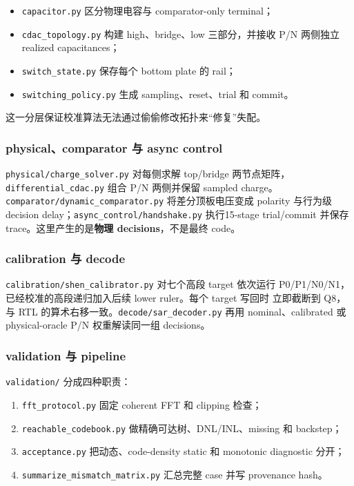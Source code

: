 \documentclass[UTF8,11pt,a4paper]{ctexart}
\newcommand{\code}[1]{\texttt{\small #1}}
\newcommand{\keyterm}[1]{\textbf{\color{DeepNavy}#1}}
\begin{document}
\begin{itemize}
  \item \code{capacitor.py} 区分物理电容与 comparator-only terminal；
  \item \code{cdac\_topology.py} 构建 high、bridge、low 三部分，并接收 P/N
    两侧独立 realized capacitances；
  \item \code{switch\_state.py} 保存每个 bottom plate 的 rail；
  \item \code{switching\_policy.py} 生成 sampling、reset、trial 和 commit。
\end{itemize}

这一分层保证校准算法无法通过偷偷修改拓扑来“修复”失配。

\subsubsection{physical、comparator 与 async control}

\code{physical/charge\_solver.py} 对每侧求解 top/bridge 两节点矩阵，
\code{differential\_cdac.py} 组合 P/N 两侧并保留 sampled charge。
\code{comparator/dynamic\_comparator.py} 将差分顶板电压变成 polarity 与行为级
decision delay；\code{async\_control/handshake.py} 执行15-stage
trial/commit 并保存 trace。这里产生的是\keyterm{物理 decisions}，不是最终 code。

\subsubsection{calibration 与 decode}

\code{calibration/shen\_calibrator.py} 对七个高段 target 依次运行
P0/P1/N0/N1，已经校准的高段递归加入后续 lower ruler。每个 target 写回时
立即截断到 Q8，与 RTL 的算术右移一致。\code{decode/sar\_decoder.py}
再用 nominal、calibrated 或 physical-oracle P/N 权重解读同一组 decisions。

\subsubsection{validation 与 pipeline}

\code{validation/} 分成四种职责：

\begin{enumerate}
  \item \code{fft\_protocol.py} 固定 coherent FFT 和 clipping 检查；
  \item \code{reachable\_codebook.py} 做精确可达树、DNL/INL、missing 和 backstep；
  \item \code{acceptance.py} 把动态、code-density static 和 monotonic diagnostic 分开；
  \item \code{summarize\_mismatch\_matrix.py} 汇总完整 case 并写 provenance hash。
\end{enumerate}
\end{document}
